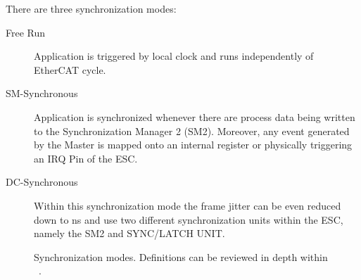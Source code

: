 There are three synchronization modes:  
\begin{description}
    \item[Free Run] Application is triggered by local clock and runs independently of EtherCAT cycle. 
    \item[SM-Synchronous] Application is synchronized whenever there are process data being written to the Synchronization Manager 2 (SM2).
    Moreover, any event generated by the Master is mapped onto an internal register or physically triggering an IRQ Pin of the ESC. 
    \item[DC-Synchronous] Within this synchronization mode the frame jitter can be even reduced down to \si{\nano\second} and use two different synchronization
    units within the ESC, namely the SM2 and SYNC/LATCH UNIT. 
\end{description}


\begin{figure}[ht]
    \centering
    \hfill
    \hfill
    \caption{Synchronization modes. Definitions can be reviewed in depth within ~\cite{beckhoff_overview}.} %
    \label{fig:syncmodes}
\end{figure} 

